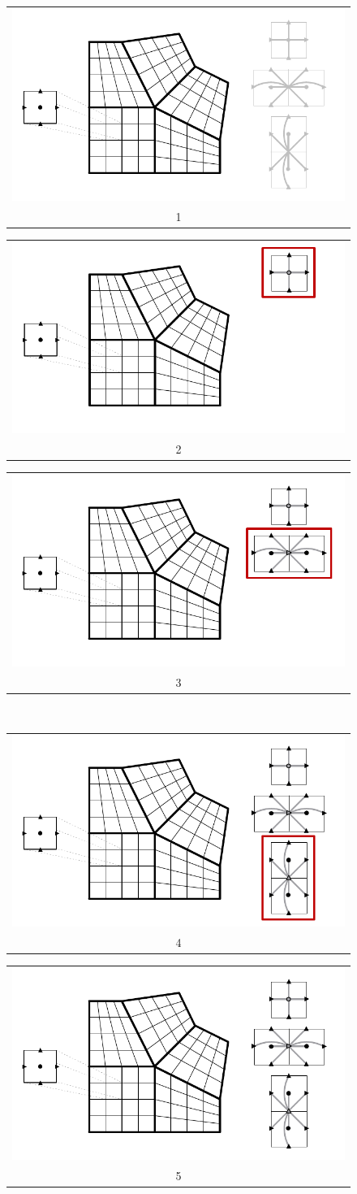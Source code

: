 \begin{figure}
\centering
\begin{tabular}{@{}c@{}}
\includegraphics[width=.32\textwidth]{figSStructGraph1}\vspace{-.5em} \\ 1
\end{tabular}
\hfill
\begin{tabular}{@{}c@{}}
\includegraphics[width=.32\textwidth]{figSStructGraph2}\vspace{-.5em} \\ 2
\end{tabular}
\hfill
\begin{tabular}{@{}c@{}}
\includegraphics[width=.32\textwidth]{figSStructGraph3}\vspace{-.5em} \\ 3
\end{tabular}
\vspace{1em} \\
\mbox{}\hfill
\begin{tabular}{@{}c@{}}
\includegraphics[width=.32\textwidth]{figSStructGraph4}\vspace{-.5em} \\ 4
\end{tabular}
\hfill
\begin{tabular}{@{}c@{}}
\includegraphics[width=.32\textwidth]{figSStructGraph5}\vspace{-.5em} \\ 5
\end{tabular}
\hfill\mbox{}
\vspace{2em} \\
\begin{minipage}{0.9\textwidth}
\begin{verbatim}
    

\end{verbatim}
\end{minipage}
\end{figure}
